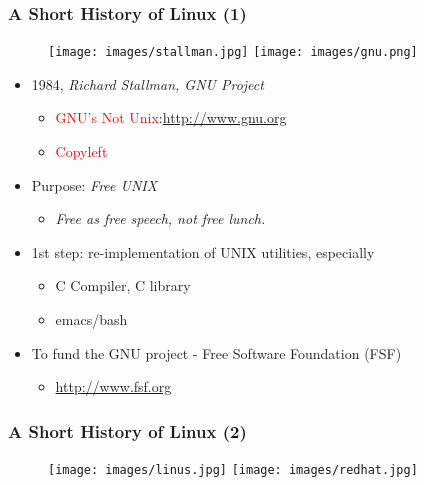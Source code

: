 \documentclass[red]{beamer}
\begin{document}
\begin{CJK*}{GBK}{kai}
\begin{frame}
\frametitle{A Short History of Linux (1)}
\begin{figure}
  \texttt{[image: images/stallman.jpg]}
 \texttt{[image: images/gnu.png]}\\
\end{figure}

\begin{itemize}
    \item 1984, \emph{Richard Stallman, GNU Project}
    \begin{itemize}
        \item \textcolor{red}{GNU's Not Unix}:\url{http://www.gnu.org}
        \item \textcolor{red}{Copyleft}
    \end{itemize}
    \item Purpose: \emph{Free UNIX}
    \begin{itemize}
        \item \emph{Free as free speech, not free lunch.}
    \end{itemize}
    \item 1st step: re-implementation of UNIX utilities, especially
    \begin{itemize}
        \item C Compiler, C library
        \item emacs/bash
    \end{itemize}
    \item To fund the GNU project - Free Software Foundation (FSF)
    \begin{itemize}
        \item \url{http://www.fsf.org}
    \end{itemize}
\end{itemize}
\end{frame}

\begin{frame}
\frametitle{A Short History of Linux (2)}
\begin{figure}
  \texttt{[image: images/linus.jpg]}
  \texttt{[image: images/redhat.jpg]}
\end{figure}


\end{frame}
\end{CJK*}
\end{document}
